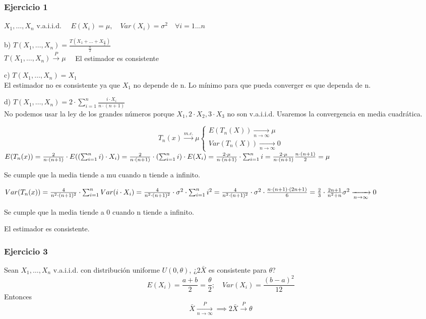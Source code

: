 
\setlength{\parskip}{1em}
\subsubsection*{Ejercicio 1}

$X_1, \dots, X_n$ v.a.i.i.d. $\quad E(X_i)=\mu,\quad Var(X_i)=\sigma^2 \quad \forall i=1 \dots n$

b) $T(X_1,\dots,X_n)=\frac{T(X_1 + \dots + X_{\frac{n}{2}})}{\frac{n}{2}}$\\
$T(X_1,\dots,X_n) \xrightarrow{P} \mu \quad$ El estimador es consistente

c) $T(X_1,\dots,X_n)=X_1$\\
El estimador no es consistente ya que $X_1$ no depende de n. Lo mínimo para que
pueda converger es que dependa de n.

d) $T(X_1,\dots,X_n)=2 \cdot \sum_{i=1}^{n}\frac{i \cdot X_i}{n \cdot (n+1)}$\\
No podemos usar la ley de los grandes números porque $X_1, 2 \cdot X_2, 3 \cdot X_3$ no son v.a.i.i.d. Usaremos la convergencia en media cuadrática.

\[
T_n(x) \xrightarrow{m.c.} \mu 
\left\{
\begin{array}{l}
    E(T_n(X)) \xrightarrow[n \to \infty]{} \mu \\
    Var(T_n(X)) \xrightarrow[n \to \infty]{} 0
\end{array}
\right.
\]
\(
E(T_n(x))=\frac{2}{n \cdot (n+1)} \cdot E((\sum_{i=1}^{n} i) \cdot X_i)
=\frac{2}{n \cdot (n+1)} \cdot (\sum_{i=1}^{n} i) \cdot  E(X_i)=
\frac{2 \cdot \mu}{n \cdot (n+1)} \cdot \sum_{i=1}^{n} i \\
=\frac{2 \cdot \mu}{n \cdot (n+1)} \frac{n \cdot (n+1)}{2}= \mu
\)

Se cumple que la media tiende a mu cuando n tiende a infinito.

\(
Var(T_n(x))=\frac{4}{n^2 \cdot (n+1)^2} \cdot \sum_{i=1}^{n} Var(i\cdot X_i)
= \frac{4}{n^2 \cdot (n+1)^2} \cdot \sigma^2 \cdot \sum_{i=1}^{n} i^2 \\
= \frac{4}{n^2 \cdot (n+1)^2} \cdot \sigma^2 \cdot \frac{n \cdot (n+1) \cdot (2n+1)}{6}
=\frac{2}{3}\cdot \frac{2n+1}{n^2+n} \sigma^2 \xrightarrow[n \to \infty]{} 0
\)

Se cumple que la media tiende a 0 cuando n tiende a infinito.

El estimador es consistente.

\subsubsection*{Ejercicio 3}
Sean $X_1, \dots, X_n$ v.a.i.i.d. con distribución uniforme $U(0,\theta)$, ¿$2 \bar{X}$ es consistente para $\theta$?
\[
E(X_i)=\frac{a+b}{2}=\frac{\theta}{2};\quad Var(X_i)=\frac{(b-a)^2}{12}
\]
Entonces 
\[
    \bar{X} \xrightarrow[n \to \infty]{P} \implies 2 \bar{X} \xrightarrow{P} \theta
\]

